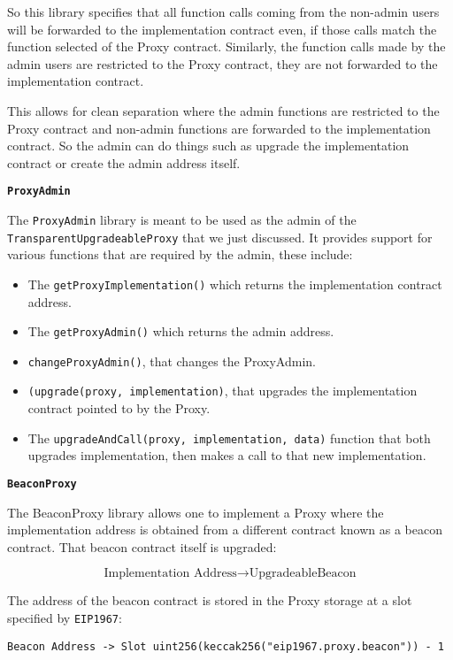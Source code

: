 So this library specifies that all function calls coming from the
non-admin users will be forwarded to the implementation contract even,
if those calls match the function selected of the Proxy contract.
Similarly, the function calls made by the admin users are restricted to
the Proxy contract, they are not forwarded to the implementation
contract.

This allows for clean separation where the admin functions are
restricted to the Proxy contract and non-admin functions are forwarded
to the implementation contract. So the admin can do things such as
upgrade the implementation contract or create the admin address itself.

\textbf{\texttt{ProxyAdmin}}

The \texttt{ProxyAdmin} library is meant to be used as the admin of the
\texttt{TransparentUpgradeableProxy} that we just discussed. It provides
support for various functions that are required by the admin, these
include:

\begin{itemize}
\tightlist
\item
  The \texttt{getProxyImplementation()} which returns the implementation
  contract address.
\item
  The \texttt{getProxyAdmin()} which returns the admin address.
\item
  \texttt{changeProxyAdmin()}, that changes the ProxyAdmin.
\item
  \texttt{(upgrade(proxy,\ implementation)}, that upgrades the
  implementation contract pointed to by the Proxy.
\item
  The \texttt{upgradeAndCall(proxy,\ implementation,\ data)} function
  that both upgrades implementation, then makes a call to that new
  implementation.
\end{itemize}

\textbf{\texttt{BeaconProxy}}

The BeaconProxy library allows one to implement a Proxy where the
implementation address is obtained from a different contract known as a
beacon contract. That beacon contract itself is upgraded:

\[\text{Implementation Address}\rightarrow\text{UpgradeableBeacon}\]

The address of the beacon contract is stored in the Proxy storage at a
slot specified by \texttt{EIP1967}:

\begin{lstlisting}[language=Solidity,numbers=none]
Beacon Address -> Slot uint256(keccak256("eip1967.proxy.beacon")) - 1
\end{lstlisting}

